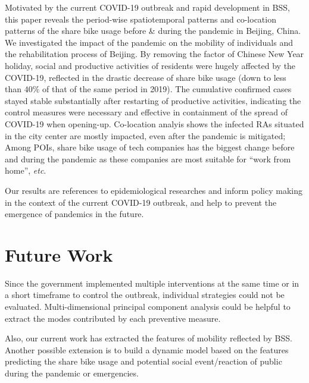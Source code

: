 \documentclass[preprints,article,accept,moreauthors,pdftex]{Definitions/mdpi}
\begin{document}
Motivated by the current COVID-19 outbreak and rapid development in BSS, this paper reveals the period-wise spatiotemporal patterns and co-location patterns of the share bike usage before \& during the pandemic in Beijing, China.
We investigated the impact of the pandemic on the mobility of individuals and the rehabilitation process of Beijing.
By removing the factor of Chinese New Year holiday, social and productive activities of residents were hugely affected by the COVID-19, reflected in the drastic decrease of share bike usage (down to less than $40\%$ of that of the same period in 2019). 
The cumulative confirmed cases stayed stable substantially after restarting of productive activities, indicating the control measures were necessary and effective in containment of the spread of COVID-19 when opening-up.
Co-location analyis shows the infected RAs situated in the city center are mostly impacted, even after the pandemic is mitigated;
Among POIs, share bike usage of tech companies has the biggest change before and during the pandemic as these companies are most suitable for ``work from home'', \textit{etc}.

Our results are references to epidemiological researches and inform policy making in the context of the current COVID-19 outbreak, and help to prevent the emergence of pandemics in the future.

\section{Future Work}

Since the government implemented multiple interventions at the same time or in a short timeframe to control the outbreak, individual strategies could not be evaluated.
Multi-dimensional principal component analysis could be helpful to extract the modes contributed by each preventive measure.

Also, our current work has extracted the features of mobility reflected by BSS.
Another possible extension is to build a dynamic model based on the features predicting the share bike usage and potential social event/reaction of public during the pandemic or emergencies.


\end{document}
